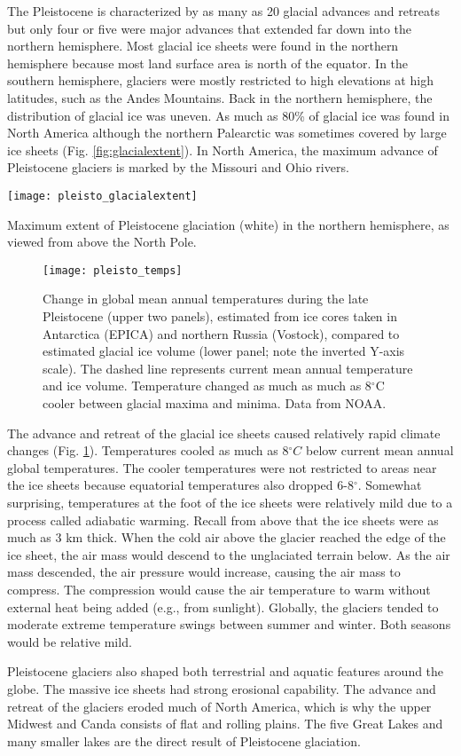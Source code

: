 \documentclass{tufte-handout}
\begin{document}
The Pleistocene is characterized by as many as 20 glacial advances and retreats but only four or five were major advances that extended far down into the northern hemisphere.  Most glacial ice sheets were found in the northern hemisphere because most land surface area is north of the equator. In the southern hemisphere, glaciers were mostly restricted to high elevations at high latitudes, such as the Andes Mountains. Back in the northern hemisphere, the distribution of glacial ice was uneven. As much as 80\% of glacial ice was found in North America although the northern Palearctic was sometimes covered by large ice sheets (Fig. \ref{fig:glacialextent}).  In North America, the maximum advance of Pleistocene glaciers is marked by the Missouri and Ohio rivers. 
\begin{marginfigure}[-6cm]%
  \texttt{[image: pleisto\_glacialextent]}
  \caption{Maximum extent of Pleistocene glaciation (white) in the northern hemisphere, as viewed from above the North Pole.}
  \label{fig:glacialextent}
\end{marginfigure}
\begin{figure}[h]
  \texttt{[image: pleisto\_temps]}%
  \caption{Change in global mean annual temperatures during the late Pleistocene (upper two panels), estimated from ice cores taken in Antarctica (EPICA) and northern Russia (Vostock), compared to estimated glacial ice volume (lower panel; note the inverted Y-axis scale). The dashed line represents current mean annual temperature and ice volume.  Temperature changed as much as much as 8$^{\circ}$C cooler between glacial maxima and minima. Data from NOAA.}%
  \label{fig:pleistotemps}%
\end{figure}
The advance and retreat of the glacial ice sheets caused relatively rapid climate changes (Fig. \ref{fig:pleistotemps}). Temperatures cooled as much as 8$^{\circ}C$ below current mean annual global temperatures.  The cooler temperatures were not restricted to areas near the ice sheets because equatorial temperatures also dropped 6-8$^{\circ}$.  Somewhat surprising, temperatures at the foot of the ice sheets were relatively mild due to a process called adiabatic warming.  Recall from above that the ice sheets were as much as 3 km thick.  When the cold air above the glacier reached the edge of the ice sheet, the air mass would descend to the unglaciated terrain below.  As the air mass descended, the air pressure would increase, causing the air mass to compress.  The compression would cause the air temperature to warm without external heat being added (e.g., from sunlight). Globally, the glaciers tended to moderate extreme temperature swings between summer and winter.  Both seasons would be relative mild. 

Pleistocene glaciers also shaped both terrestrial and aquatic features around the globe. The massive ice sheets had strong erosional capability. The advance and retreat of the glaciers eroded much of North America, which is why the upper Midwest and Canda consists of flat and rolling plains.   The five Great Lakes and many smaller lakes are the direct result of Pleistocene glaciation.  
\end{document}
